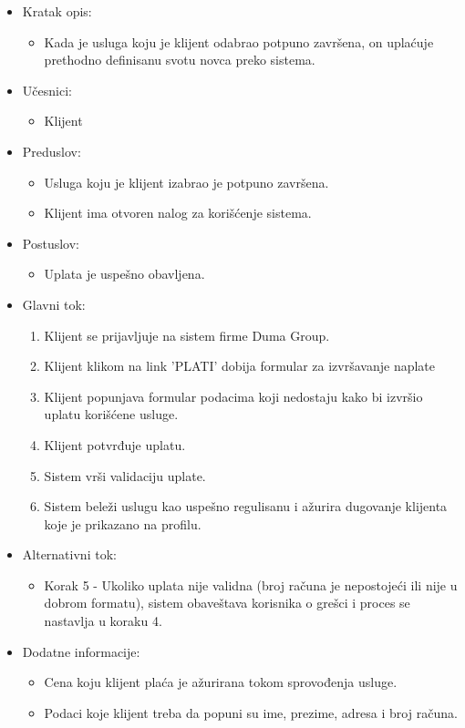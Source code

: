 \documentclass[a4paper]{article}
\begin{document}
\begin{itemize}
    \item Kratak opis: 
    \begin{itemize}
        \item Kada je usluga koju je klijent odabrao potpuno završena, on uplaćuje prethodno definisanu svotu novca preko sistema.
    \end{itemize}
    \item Učesnici:
        \begin{itemize}
        \item Klijent
    \end{itemize}
    \item Preduslov:
        \begin{itemize}
            \item Usluga koju je klijent izabrao je potpuno završena.
            \item Klijent ima otvoren nalog za korišćenje sistema.
        \end{itemize}
    \item Postuslov:
        \begin{itemize}
            \item Uplata je uspešno obavljena.
            \end{itemize}
    \item Glavni tok:
        \begin{enumerate}
            \item Klijent se prijavljuje na sistem firme Duma Group.
            \item Klijent klikom na link 'PLATI' dobija formular za izvršavanje naplate
            \item Klijent popunjava formular podacima koji nedostaju kako bi izvršio uplatu korišćene usluge.
            \item Klijent potvrđuje uplatu.
            \item Sistem vrši validaciju uplate.
            \item Sistem beleži uslugu kao uspešno regulisanu i ažurira dugovanje klijenta koje je prikazano na profilu.
        \end{enumerate}
    \item Alternativni tok:
        \begin{itemize}
            \item Korak 5 - Ukoliko uplata nije validna (broj računa je nepostojeći ili nije u dobrom formatu), sistem obaveštava korisnika o grešci i proces se nastavlja u koraku 4.  
    \end{itemize}
    \item Dodatne informacije:
        \begin{itemize}
            \item Cena koju klijent plaća je ažurirana tokom sprovođenja usluge.
            \item Podaci koje klijent treba da popuni su ime, prezime, adresa i broj računa.
        \end{itemize}
\end{itemize}
\end{document}

